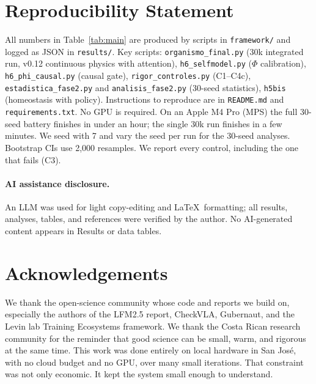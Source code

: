 \documentclass[11pt,a4paper]{article}
\begin{document}
\section{Reproducibility Statement}

All numbers in Table~\ref{tab:main} are produced by scripts in \texttt{framework/} and logged as JSON in \texttt{results/}. Key scripts: \texttt{organismo\_final.py} (30k integrated run, v0.12 continuous physics with attention), \texttt{h6\_selfmodel.py} ($\Phi$ calibration), \texttt{h6\_phi\_causal.py} (causal gate), \texttt{rigor\_controles.py} (C1--C4c), \texttt{estadistica\_fase2.py} and \texttt{analisis\_fase2.py} (30-seed statistics), \texttt{h5bis} (homeostasis with policy). Instructions to reproduce are in \texttt{README.md} and \texttt{requirements.txt}. No GPU is required. On an Apple M4 Pro (MPS) the full 30-seed battery finishes in under an hour; the single 30k run finishes in a few minutes. We seed with 7 and vary the seed per run for the 30-seed analyses. Bootstrap CIs use 2,000 resamples. We report every control, including the one that fails (C3).

\paragraph{AI assistance disclosure.} An LLM was used for light copy-editing and \LaTeX\ formatting; all results, analyses, tables, and references were verified by the author. No AI-generated content appears in Results or data tables.

\section{Acknowledgements}

We thank the open-science community whose code and reports we build on, especially the authors of the LFM2.5 report, CheckVLA, Gubernaut, and the Levin lab Training Ecosystems framework. We thank the Costa Rican research community for the reminder that good science can be small, warm, and rigorous at the same time. This work was done entirely on local hardware in San Jos\'e, with no cloud budget and no GPU, over many small iterations. That constraint was not only economic. It kept the system small enough to understand.
\end{document}
